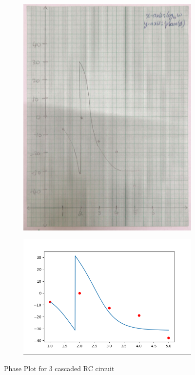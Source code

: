 \documentclass{article}
\begin{document}
\begin{figure}[H]
    \centering
    \begin{subfigure}[b]{0.45\textwidth}
        \centering
        \includegraphics[width=\textwidth]{figs/phase3.png}
    \end{subfigure}
    \hfill
    \begin{subfigure}[b]{0.45\textwidth}
        \centering
        \includegraphics[width=1.7\textwidth]{figs/phase_3cas.png}
    \end{subfigure}
    
    \caption{Phase Plot for 3 cascaded RC circuit}
\end{figure}
\end{document}

